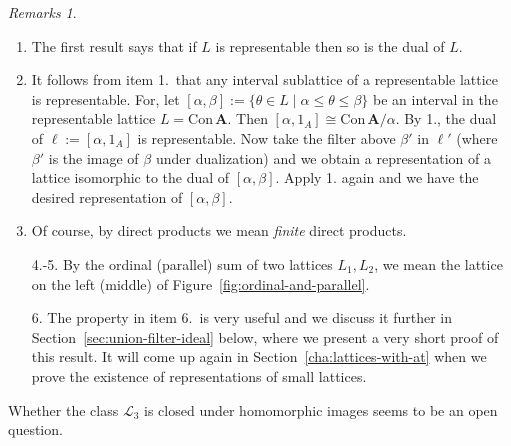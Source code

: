 \documentclass[cm,dissertation]{uhthesis}
\theoremstyle{plain}
\theoremstyle{definition}
\theoremstyle{remark}
\newtheorem*{remarks}{Remarks}
\numberwithin{theorem}{section}
\numberwithin{claim}{chapter}
\numberwithin{equation}{section}
\numberwithin{conjecture}{chapter}
\newcommand{\<}{\ensuremath{\langle}}
\renewcommand{\>}{\ensuremath{\rangle}}
\renewcommand{\leq}{\ensuremath{\leqslant}}
\newcommand{\Con}{\ensuremath{\mathrm{Con\,}}}
\newcommand{\0}{\ensuremath{\mathbf{0}}}
\newcommand{\1}{\ensuremath{\mathbf{1}}}
\newcommand{\2}{\ensuremath{\mathbf{2}}}
\newcommand{\3}{\ensuremath{\mathbf{3}}}
\newcommand{\4}{\ensuremath{\mathbf{4}}}
\newcommand{\5}{\ensuremath{\mathbf{5}}}
\newcommand{\bA}{\ensuremath{\mathbf{A}}}
\newcommand{\bB}{\ensuremath{\mathbf{B}}}
\newcommand{\sL}{\ensuremath{\mathscr{L}}}
\begin{document}
      \begin{remarks}
        ~
      \begin{enumerate} %
      \item  The first result says that if $L$ is representable then so is the
        dual of $L$. 
        \item It follows from item 1.~that any interval sublattice of a representable lattice is
        representable.  For, let $[\alpha, \beta] := \{\theta \in L \mid \alpha \leq \theta \leq \beta\}$ be an
        interval in the representable lattice $L= \Con\bA$.  Then $[\alpha, 1_A] \cong \Con
        \bA/\alpha$. By 1., the dual of $\ell := [\alpha, 1_A]$ is
        representable. %
        Now take the filter above $\beta'$ in $\ell'$ (where $\beta'$ is the
        image of $\beta$ under dualization) and we obtain a representation of a
        lattice isomorphic to the dual of $[\alpha, \beta]$.  Apply 1.
        again and we have the desired representation of $[\alpha, \beta]$.

      \item Of course, by direct products we mean \emph{finite} direct products.
      \item[4.-5.] By the
          
        ordinal (parallel) sum of two lattices $L_1, L_2$, we mean the lattice
        on the left (middle) of Figure~\ref{fig:ordinal-and-parallel}.

\item[6.] The property in item 6.~is very useful and we discuss it further in
  Section~\ref{sec:union-filter-ideal} below, where we present a very short proof of
  this result.  It will come up again in
  Section~\ref{cha:lattices-with-at} when we prove the existence of
  representations of small lattices.
      \end{enumerate}
      Whether the class $\sL_3$ is closed under homomorphic images
      seems to be an open question. 
      \end{remarks}


\end{document}
